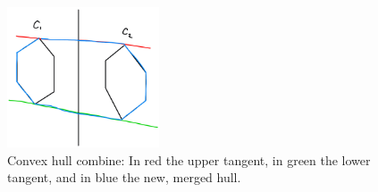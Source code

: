 \begin{figure}[hpt]
    \centering
    \includegraphics[width=0.4\textwidth]{figures/convex-merge.jpeg}
    \caption{Convex hull combine: In red the upper tangent, in green
    the lower tangent, and in blue the new, merged hull.}
    \label{fig:convex-merge}
\end{figure}






